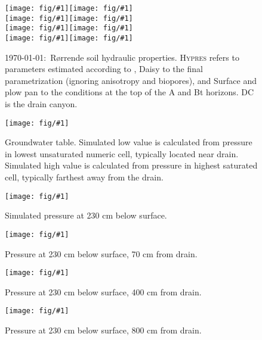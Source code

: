 \documentclass[a4paper]{article}
\newcommand{\figl}{\hspace*{-2cm}}
\newcommand{\figright}[1]{\texttt{[image: fig/\#1]}}
\newcommand{\fig}[1]{\figl\figright{#1}}
\newcommand{\Hypres}{\textsc{Hypres}}
\newcommand{\MyID}{\today:~}
\begin{document}
\begin{figure}[htbp] 
  \fig{Rorrende-Ap-Theta}\figright{Rorrende-Ap-K}\\
  \fig{Rorrende-Bt-Theta}\figright{Rorrende-Bt-K}\\
  \fig{Rorrende-C-Theta}\figright{Rorrende-C-K}\\
  \fig{Rorrende-DC-Theta}\figright{Rorrende-DC-K}
  \caption{\MyID{}R{\o}rrende soil hydraulic properties.  \Hypres{} refers to
    parameters estimated according to \citet{hypres}, Daisy to the
    final parametrization (ignoring anisotropy and biopores), and
    Surface and plow pan to the conditions at the top of the A and Bt
    horizons.  DC is the drain canyon.}
  \label{fig:Rorrende-hor}
\end{figure}

\begin{figure}[htbp]
  \begin{center}
    \fig{gwt}
  \end{center}
  \caption{Groundwater table.  Simulated low value is calculated from
    pressure in lowest unsaturated numeric cell, typically located
    near drain.  Simulated high value is calculated from pressure in
    highest saturated cell, typically farthest away from the drain.}
  \label{fig:gw}
\end{figure}

\begin{figure}[htbp]
  \begin{center}
    \fig{piezo-sim}
  \end{center}
  \caption{Simulated pressure at 230 cm below surface.}
  \label{fig:piezo-sim}
\end{figure}

\begin{figure}[htbp]
  \begin{center}
    \fig{piezo-70}
  \end{center}
  \caption{Pressure at 230 cm below surface, 70 cm from drain.}
  \label{fig:piezo-70}
\end{figure}

\begin{figure}[htbp]
  \begin{center}
    \fig{piezo-400}
  \end{center}
  \caption{Pressure at 230 cm below surface, 400 cm from drain.}
  \label{fig:piezo-400}
\end{figure}

\begin{figure}[htbp]
  \begin{center}
    \fig{piezo-800}
  \end{center}
  \caption{Pressure at 230 cm below surface, 800 cm from drain.}
  \label{fig:piezo-800}
\end{figure}

\pagestyle{empty}

\end{document}
